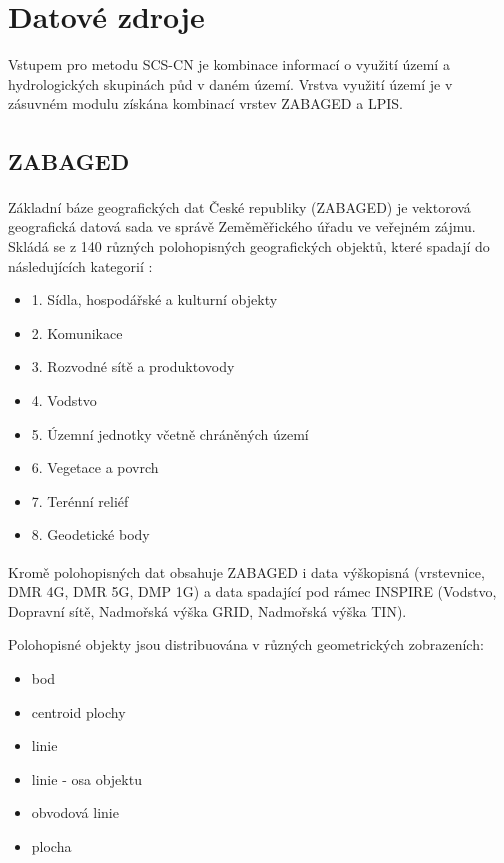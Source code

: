 \documentclass[a4paper,oneside,12pt]{book}
\begin{document}
\chapter{Datové zdroje} \label{data}
\hspace{10mm} Vstupem pro metodu SCS-CN je kombinace informací o využití území a hydrologických skupinách půd v daném území. Vrstva využití území je v zásuvném modulu získána kombinací vrstev ZABAGED a LPIS. 

\section{ZABAGED\texorpdfstring{\textsuperscript{\textregistered}}{ (R)}} \label{zabaged}

\hspace{10mm} Základní báze geografických dat České republiky (ZABAGED\texorpdfstring{\textsuperscript{\textregistered}}{ (R)}) je vektorová geografická datová sada ve správě Zeměměřického úřadu ve veřejném zájmu. Skládá se z 140 různých polohopisných geografických objektů, které spadají do následujících kategorií \cite{nEFEg7XpI9hVQCiO} :
\begin{itemize}
\item 1. Sídla, hospodářské a kulturní objekty
\item 2. Komunikace
\item 3. Rozvodné sítě a produktovody
\item 4. Vodstvo 
\item 5. Územní jednotky včetně chráněných území
\item 6. Vegetace a povrch
\item 7. Terénní reliéf
\item 8. Geodetické body
\end{itemize}
\hspace{10mm} Kromě polohopisných dat obsahuje ZABAGED\texorpdfstring{\textsuperscript{\textregistered}}{ (R)} i data výškopisná (vrstevnice, DMR 4G, DMR 5G, DMP 1G) a data spadající pod rámec INSPIRE (Vodstvo, Dopravní sítě, Nadmořská výška GRID, Nadmořská výška TIN). \cite{nEFEg7XpI9hVQCiO} 


\hspace{10mm} Polohopisné objekty jsou distribuována v různých geometrických zobrazeních:
\begin{itemize}
\item bod
\item centroid plochy
\item linie
\item linie - osa objektu
\item obvodová linie
\item plocha
\end{itemize}
\end{document}
